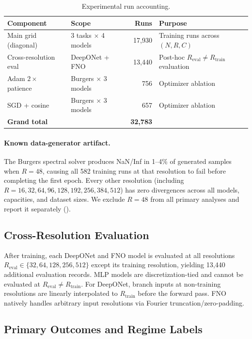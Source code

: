 \documentclass[11pt]{article}
\newcommand{\Reval}{R_{\mathrm{eval}}}
\newcommand{\Rtrain}{R_{\mathrm{train}}}
\newcommand{\totalRuns}{32{,}783}
\newcommand{\crossResRows}{13{,}440}
\newcommand{\nDiagTraining}{17{,}930}
\begin{document}
\begin{table}[h]
\centering
\caption{Experimental run accounting.}
\label{tab:run-accounting}
\small
\begin{tabular}{@{}llrl@{}}
\toprule
\textbf{Component} & \textbf{Scope} & \textbf{Runs} &
\textbf{Purpose} \\
\midrule
Main grid (diagonal) & 3 tasks $\times$ 4 models & \nDiagTraining{} &
  Training runs across $(N, R, C)$ \\
Cross-resolution eval & DeepONet + FNO & \crossResRows{} &
  Post-hoc $\Reval \neq \Rtrain$ evaluation \\
Adam $2\times$ patience & Burgers $\times$ 3 models & 756 &
  Optimizer ablation \\
SGD + cosine & Burgers $\times$ 3 models & 657 &
  Optimizer ablation \\
\midrule
\textbf{Grand total} & & \textbf{\totalRuns{}} & \\
\bottomrule
\end{tabular}
\end{table}

\paragraph{Known data-generator artifact.}
The Burgers spectral solver produces NaN/Inf in 1--4\% of generated
samples when $R{=}48$, causing all 582 training runs at that resolution
to fail before completing the first epoch. Every other resolution
(including $R{=}16, 32, 64, 96, 128, 192, 256, 384, 512$) has zero
divergences across all models, capacities, and dataset sizes. We
exclude $R{=}48$ from all primary analyses and report it separately
().

\subsection{Cross-Resolution Evaluation}

After training, each DeepONet and FNO model is evaluated at all
resolutions $\Reval \in \{32, 64, 128, 256, 512\}$ except its
training resolution, yielding \crossResRows{} additional evaluation
records. MLP models are discretization-tied and cannot be evaluated
at $\Reval \neq \Rtrain$. For DeepONet, branch inputs at non-training
resolutions are linearly interpolated to $\Rtrain$ before the forward
pass. FNO natively handles arbitrary input resolutions via Fourier
truncation/zero-padding.

\subsection{Primary Outcomes and Regime Labels}
\label{sec:outcomes}
\end{document}

